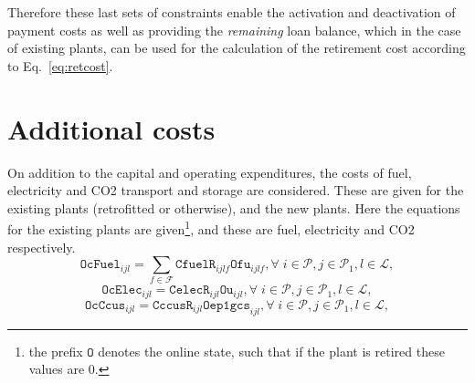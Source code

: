 \documentclass{amsart}
\begin{document}
Therefore these last sets of constraints enable the activation and deactivation
of payment costs as well as providing the \emph{remaining} loan balance, which
in the case of existing plants, can be used for the calculation of the
retirement cost according to Eq.~\eqref{eq:retcost}.
%
\section{Additional costs}
%
%
On addition to the capital and operating expenditures, the costs of fuel,
electricity and CO2 transport and storage are considered. These are given for
the existing plants (retrofitted or otherwise), and the new plants.
Here the equations for the existing plants are given\footnote{the prefix
$\mathtt{O}$ denotes the online state, such that if the plant is retired these
values are 0.}, and these are fuel, electricity and CO2 respectively.
%
\begin{equation}
    \mathtt{OcFuel}_{ijl} = \sum_{f \in \mathcal{F}} 
    \mathtt{CfuelR}_{ijlf} \mathtt{Ofu}_{ijlf},
    \forall \; i \in \mathcal{P},j \in \mathcal{P}_1 ,
    l \in \mathcal{L},
\end{equation}
%
\begin{equation}
    \mathtt{OcElec}_{ijl} = \mathtt{CelecR}_{ijl} \mathtt{Ou}_{ijl},
    \forall \; i \in \mathcal{P},j \in \mathcal{P}_1 , l \in \mathcal{L},
\end{equation}
%
\begin{equation}
    \mathtt{OcCcus}_{ijl} = \mathtt{CccusR}_{ijl} \mathtt{Oep1gcs}_{ijl},
    \forall \; i \in \mathcal{P},j \in \mathcal{P}_1 , l \in \mathcal{L},
\end{equation}
%
\end{document}
